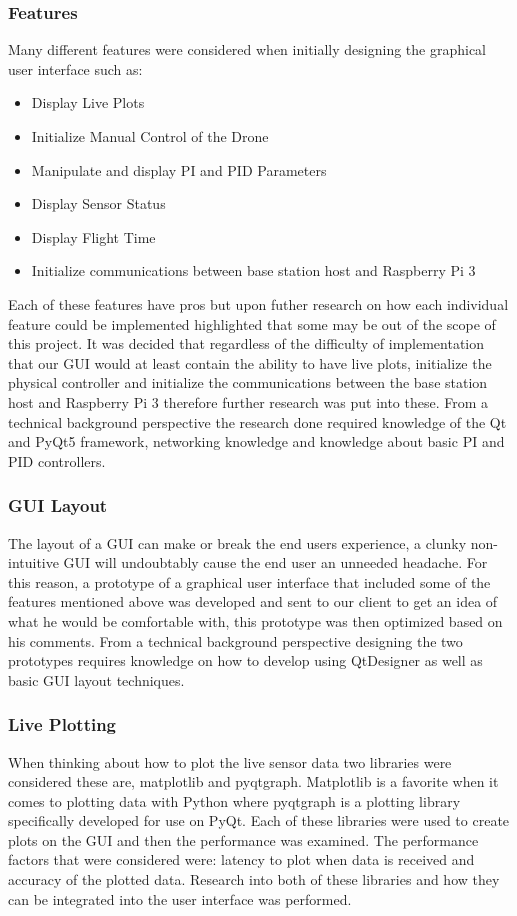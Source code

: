 \subsubsection{Features}
Many different features were considered when initially designing the graphical user interface such as: 
\begin{itemize}
	\item Display Live Plots 
	\item Initialize Manual Control of the Drone
	\item Manipulate and display PI and PID Parameters
	\item Display Sensor Status
	\item Display Flight Time
	\item Initialize communications between base station host and Raspberry Pi 3
\end{itemize}
Each of these features have pros but upon futher research on how each individual feature could be implemented highlighted that some may be out of the scope of this project. It was decided that regardless of the difficulty of implementation that our GUI would at least contain the ability to have live plots, initialize the physical controller and initialize the communications between the base station host and Raspberry Pi 3 therefore further research was put into these. From a technical background perspective the research done required knowledge of the Qt and PyQt5 framework, networking knowledge and knowledge about basic PI and PID controllers.  

\subsubsection{GUI Layout}  
The layout of a GUI can make or break the end users experience, a clunky non-intuitive GUI will undoubtably cause the end user an unneeded headache. For this reason, a prototype of a graphical user interface that included some of the features mentioned above was developed and sent to our client to get an idea of what he would be comfortable with, this prototype was then optimized based on his comments. From a technical background perspective designing the two prototypes requires knowledge on how to develop using QtDesigner as well as basic GUI layout techniques. 

\subsubsection{Live Plotting}
When thinking about how to plot the live sensor data two libraries were considered these are, matplotlib and pyqtgraph. Matplotlib is a favorite when it comes to plotting data with Python where pyqtgraph is a plotting library specifically developed for use on PyQt. Each of these libraries were used to create plots on the GUI and then the performance was examined. The performance factors that were considered were: latency to plot when data is received and accuracy of the plotted data. Research into both of these libraries and how they can be integrated into the user interface was performed.





